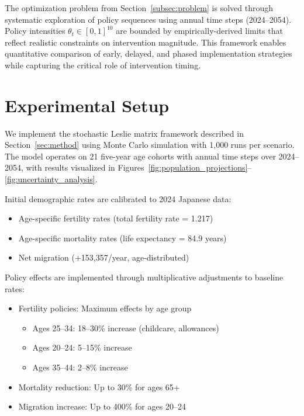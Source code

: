 \documentclass{article} %
\begin{document}
The optimization problem from Section~\ref{subsec:problem} is solved through systematic exploration of policy sequences using annual time steps (2024--2054). Policy intensities $\theta_t \in [0,1]^{10}$ are bounded by empirically-derived limits that reflect realistic constraints on intervention magnitude. This framework enables quantitative comparison of early, delayed, and phased implementation strategies while capturing the critical role of intervention timing.

\section{Experimental Setup}
\label{sec:experimental}

We implement the stochastic Leslie matrix framework described in Section~\ref{sec:method} using Monte Carlo simulation with 1,000 runs per scenario. The model operates on 21 five-year age cohorts with annual time steps over 2024--2054, with results visualized in Figures~\ref{fig:population_projections}--\ref{fig:uncertainty_analysis}.

Initial demographic rates are calibrated to 2024 Japanese data:
\begin{itemize}
    \item Age-specific fertility rates (total fertility rate = 1.217)
    \item Age-specific mortality rates (life expectancy = 84.9 years)
    \item Net migration (+153,357/year, age-distributed)
\end{itemize}

Policy effects are implemented through multiplicative adjustments to baseline rates:
\begin{itemize}
    \item Fertility policies: Maximum effects by age group
        \begin{itemize}
            \item Ages 25--34: 18--30\% increase (childcare, allowances)
            \item Ages 20--24: 5--15\% increase
            \item Ages 35--44: 2--8\% increase
        \end{itemize}
    \item Mortality reduction: Up to 30\% for ages 65+
    \item Migration increase: Up to 400\% for ages 20--24
\end{itemize}
\end{document}
